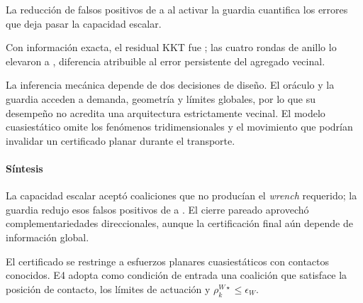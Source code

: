 \begin{samepage}
La reducción de falsos positivos de \SPThreeUnguardedFP{} a \SPThreeGuardedFP{} al activar la guardia cuantifica los errores que deja pasar la capacidad escalar.

Con información exacta, el residual KKT fue \SPThreeExactKKT{}; las cuatro rondas de anillo lo elevaron a \SPThreeRingKKT{}, diferencia atribuible al error persistente del agregado vecinal.
\end{samepage}

La inferencia mecánica depende de dos decisiones de diseño. El oráculo y la guardia acceden a demanda, geometría y límites globales, por lo que su desempeño no acredita una arquitectura estrictamente vecinal. El modelo cuasiestático omite los fenómenos tridimensionales y el movimiento que podrían invalidar un certificado planar durante el transporte.

\paragraph{Síntesis}

La capacidad escalar aceptó coaliciones que no producían el \emph{wrench} requerido; la guardia redujo esos falsos positivos de \SPThreeUnguardedFP{} a \SPThreeGuardedFP{}. El cierre pareado aprovechó complementariedades direccionales, aunque la certificación final aún depende de información global.

El certificado se restringe a esfuerzos planares cuasiestáticos con contactos conocidos. E4 adopta como condición de entrada una coalición que satisface la posición de contacto, los límites de actuación y $\rho_k^{W\star}\leq\epsilon_W$.
